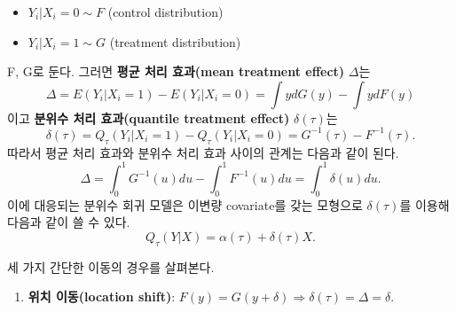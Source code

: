 \documentclass[b5paper,]{scrbook}
\providecommand{\tightlist}{%
  \setlength{\itemsep}{0pt}\setlength{\parskip}{0pt}}
\theoremstyle{plain}
\theoremstyle{definition}
\numberwithin{equation}{section}
\begin{document}
\begin{itemize}
\item
  \(Y_{i}|X_{i}=0\sim F\) (control distribution)
\item
  \(Y_{i}|X_{i}=1\sim G\) (treatment distribution)
\end{itemize}

F, G로 둔다. 그러면 \textbf{평균 처리 효과(mean treatment effect)} \(\Delta\)는
\[\Delta = E(Y_{i}|X_{i}=1) - E(Y_{i}|X_{i}=0)=\int ydG(y) - \int ydF(y)\]
이고 \textbf{분위수 처리 효과(quantile treatment effect)} \(\delta(\tau)\)는
\[\delta(\tau)=Q_{\tau}(Y_{i}|X_{i}=1) -Q_{\tau}(Y_{i}|X_{i}=0)=G^{-1}(\tau)-F^{-1}(\tau).\]
따라서 평균 처리 효과와 분위수 처리 효과 사이의 관계는 다음과 같이 된다.
\[\Delta=\int_{0}^{1}G^{-1}(u)du - \int_{0}^{1}F^{-1}(u)du = \int_{0}^{1}\delta(u)du.\]
이에 대응되는 분위수 회귀 모델은 이변량 covariate를 갖는 모형으로 \(\delta(\tau)\)를 이용해 다음과 같이 쓸 수 있다.
\[Q_{\tau}(Y|X)=\alpha(\tau)+\delta(\tau)X.\]

세 가지 간단한 이동의 경우를 살펴본다.

\begin{enumerate}
\def\labelenumi{\arabic{enumi}.}
\tightlist
\item
  \textbf{위치 이동(location shift)}: \(F(y)=G(y+\delta) \Rightarrow \delta(\tau)=\Delta = \delta\).
\end{enumerate}
\end{document}
